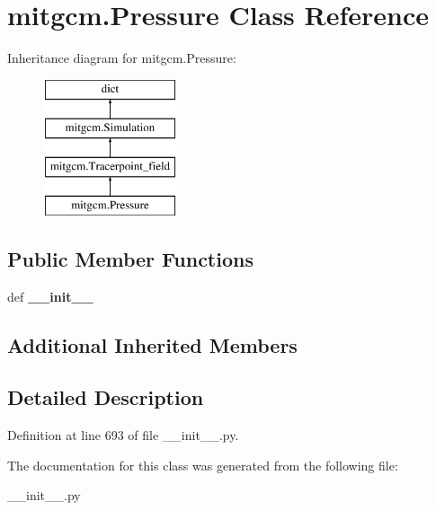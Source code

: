 \hypertarget{classmitgcm_1_1Pressure}{\section{mitgcm.\+Pressure Class Reference}
\label{classmitgcm_1_1Pressure}
}
Inheritance diagram for mitgcm.\+Pressure\+:\begin{figure}[H]
\begin{center}
\leavevmode
\includegraphics[height=4.000000cm]{classmitgcm_1_1Pressure}
\end{center}
\end{figure}
\subsection*{Public Member Functions}
\begin{DoxyCompactItemize}
\item 
\hypertarget{classmitgcm_1_1Pressure_a8233e6b8676c7405e760cdfea4f1bde3}{def {\bfseries \+\_\+\+\_\+init\+\_\+\+\_\+}}\label{classmitgcm_1_1Pressure_a8233e6b8676c7405e760cdfea4f1bde3}

\end{DoxyCompactItemize}
\subsection*{Additional Inherited Members}


\subsection{Detailed Description}


Definition at line 693 of file \+\_\+\+\_\+init\+\_\+\+\_\+.\+py.



The documentation for this class was generated from the following file\+:\begin{DoxyCompactItemize}
\item 
\+\_\+\+\_\+init\+\_\+\+\_\+.\+py\end{DoxyCompactItemize}
